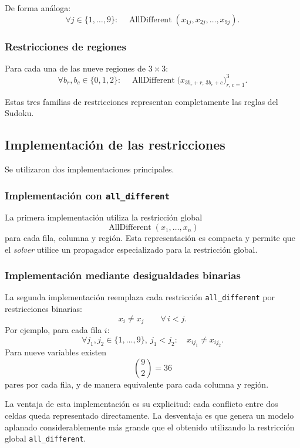 \documentclass[12pt]{article}
\begin{document}
De forma análoga:
\[
\forall j\in\{1,\ldots,9\}:\quad
\operatorname{AllDifferent}(x_{1j},x_{2j},\ldots,x_{9j}).
\]

\subsubsection{Restricciones de regiones}

Para cada una de las nueve regiones de $3\times 3$:
\[
\forall b_r,b_c\in\{0,1,2\}:\quad
\operatorname{AllDifferent}\bigl(x_{3b_r+r,\,3b_c+c}\bigr)_{r,c=1}^{3}.
\]

Estas tres familias de restricciones representan completamente las reglas del Sudoku.

\subsection{Implementación de las restricciones}

Se utilizaron dos implementaciones principales.

\subsubsection{Implementación con \texorpdfstring{\texttt{all\_different}}{all\_different}}

La primera implementación utiliza la restricción global
\[
\operatorname{AllDifferent}(x_1,\ldots,x_n)
\]
para cada fila, columna y región. Esta representación es compacta y permite que el \emph{solver} utilice un propagador especializado para la restricción global.

\subsubsection{Implementación mediante desigualdades binarias}

La segunda implementación reemplaza cada restricción \texttt{all\_different} por restricciones binarias:
\[
x_i\neq x_j \qquad \forall\, i<j.
\]
Por ejemplo, para cada fila $i$:
\[
\forall j_1,j_2\in\{1,\ldots,9\},\ j_1<j_2:\quad
x_{ij_1}\neq x_{ij_2}.
\]
Para nueve variables existen
\[
\binom{9}{2}=36
\]
pares por cada fila, y de manera equivalente para cada columna y región.

La ventaja de esta implementación es su explicitud: cada conflicto entre dos celdas queda representado directamente. La desventaja es que genera un modelo aplanado considerablemente más grande que el obtenido utilizando la restricción global \texttt{all\_different}.
\end{document}
